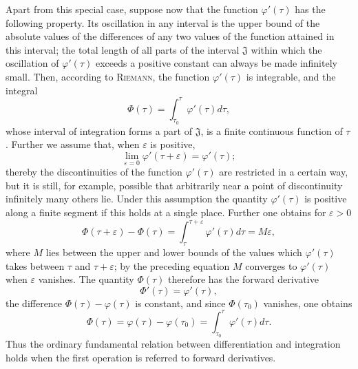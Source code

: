 \documentclass[11pt,a4paper,leqno]{article}
\begin{document}
Apart from this special case, suppose now that the function $\varphi'(\tau)$ has the following property. Its oscillation in any interval is the upper bound of the absolute values of the differences of any two values of the function attained in this interval; the total length of all parts of the interval $\mathfrak{J}$ within which the oscillation of $\varphi'(\tau)$ exceeds a positive constant
can always be made infinitely small. Then, according to \textsc{Riemann}, the function $\varphi'(\tau)$ is integrable, and the integral
\[
\Phi(\tau)=\int_{\tau_0}^{\tau}\varphi'(\tau)d\tau,
\]
whose interval of integration forms a part of $\mathfrak{J}$, is a finite continuous function of $\tau$. Further we assume that, when $\varepsilon$ is positive,
\[
\lim_{\varepsilon=0}\varphi'(\tau+\varepsilon)=\varphi'(\tau);
\]
thereby the discontinuities of the function $\varphi'(\tau)$ are restricted in a certain way, but it is still, for example, possible that arbitrarily near a point of discontinuity infinitely many others lie. Under this assumption the quantity $\varphi'(\tau)$ is positive along a finite segment if this holds at a single place. Further one obtains for $\varepsilon>0$
\[
\Phi(\tau+\varepsilon)-\Phi(\tau)
=\int_{\tau}^{\tau+\varepsilon}\varphi'(\tau)d\tau=M\varepsilon,
\]
where $M$ lies between the upper and lower bounds of the values which $\varphi'(\tau)$ takes between $\tau$ and $\tau+\varepsilon$; by the preceding equation $M$ converges to $\varphi'(\tau)$ when $\varepsilon$ vanishes. The quantity $\Phi(\tau)$ therefore has the forward derivative
\[
\Phi'(\tau)=\varphi'(\tau),
\]
the difference $\Phi(\tau)-\varphi(\tau)$ is constant, and since $\Phi(\tau_0)$ vanishes, one obtains
\[
\Phi(\tau)=\varphi(\tau)-\varphi(\tau_0)=\int_{\tau_0}^{\tau}\varphi'(\tau)d\tau.
\]
Thus the ordinary fundamental relation between differentiation and integration holds when the first operation is referred to forward derivatives.
\end{document}
